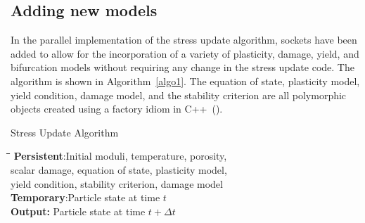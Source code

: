 \subsection{Adding new models}
  In the parallel implementation of the stress update algorithm, sockets have 
  been added to allow for the incorporation of a variety of plasticity, damage, 
  yield, and bifurcation models without requiring any change in the stress 
  update code.  The algorithm is shown in Algorithm~\ref{algo1}.  The
  equation of state, plasticity model, yield condition, damage model, and
  the stability criterion are all polymorphic objects created using a 
  factory idiom in C++~(\cite{Coplien1992}).
  \begin{table}[p]
    \caption{Stress Update Algorithm} \label{algo1}
    \vspace{12pt}
    \begin{tabbing}
    \quad \=\quad \=\quad \=\quad \=\quad \kill
    {\bf Persistent}:Initial moduli, temperature, porosity, \\
      \>\>        scalar damage, equation of state, plasticity model, \\
      \>\>        yield condition, stability criterion, damage model\\
    {\bf Temporary}:Particle state at time $t$ \\
    {\bf Output:} Particle state at time $t+\Delta t$\\ \\


\end{tabbing}
\end{table}
